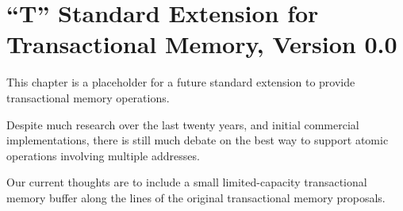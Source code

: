 \chapter{``T'' Standard Extension for Transactional Memory, Version 0.0}
\label{sec:tm}

This chapter is a placeholder for a future standard extension to
provide transactional memory operations.

\begin{commentary}
Despite much research over the last twenty years, and initial
commercial implementations, there is still much debate on the best way
to support atomic operations involving multiple addresses.

Our current thoughts are to include a small limited-capacity
transactional memory buffer along the lines of the original
transactional memory proposals.
\end{commentary}

